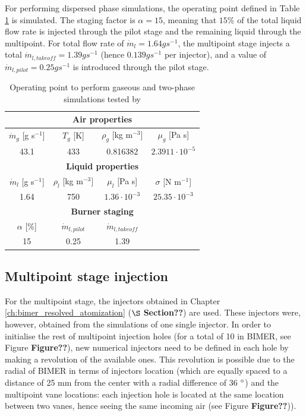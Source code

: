 For performing dispersed phase simulations, the operating point defined in Table \ref{tab:liquid_operating_point_Renaud} is simulated. The staging factor is $\alpha = 15$, meaning that $15 \%$ of the total liquid flow rate is injected through the pilot stage and the remaining liquid through the multipoint. For total flow rate of $\dot{m}_l = 1.64 g s^{-1}$, the multipoint stage injects a total $\dot{m}_{l,takeoff} = 1.39 g s^{-1}$ (hence $0.139 g s^{-1}$ per injector), and a value of $\dot{m}_{l,pilot} = 0.25 g s^{-1}$ is introduced through the pilot stage.

\begin{table}[!h]
\centering
\caption{Operating point to perform gaseous and two-phase simulations tested by }
\begin{tabular}{|c|c|c|c|}
\hline
\multicolumn{4}{|c|}{\textbf{Air properties}} \\
\hline
$\dot{m}_g$ [g s$^{-1}$] & $T_g$ [K] & $\rho_g$ [kg m$^{-3}$]  & $\mu_g$ [Pa s]  \\
\hline
43.1 & 433 & 0.816382 & $2.3911 \cdot 10^{-5}$ \\
\hline
\hline
\multicolumn{4}{|c|}{\textbf{Liquid properties}} \\
\hline
$\dot{m}_l$ [g s$^{-1}$] & $\rho_l$ [kg m$^{-3}]$   & $\mu_l$ [Pa s]   & $\sigma$ [N m$^{-1}$]   \\
\hline
1.64 & 750 & $1.36 \cdot 10^{-3}$ & $25.35 \cdot 10^{-3}$ \\
\hline
\hline
\multicolumn{4}{|c|}{\textbf{Burner staging}} \\
\hline
$\alpha$ [$\%$] & $\dot{m}_{l,pilot}$ & $\dot{m}_{l,takeoff}$ & \\
\hline
15 & 0.25 & 1.39 & \\
\hline
\end{tabular}
\label{tab:liquid_operating_point_Renaud}
\end{table}


\subsection{Multipoint stage injection}

For the multipoint stage, the injectors obtained in Chapter \ref{ch:bimer_resolved_atomization} ($\S$ \textbf{Section??}) are used. These injectors were, however, obtained from the simulations of one single injector. In order to initialise the rest of multipoint injection holes (for a total of 10 in BIMER, see Figure \textbf{Figure??}), new numerical injectors need to be defined in each hole by making a revolution of the available ones. This revolution is possible due to the radial of BIMER in terms of injectors location (which are equally spaced to a distance of 25 mm from the center with a radial difference of 36 $\degree$) and the multipoint vane locations: each injection hole is located at the same location between two vanes, hence seeing the same incoming air (see Figure \textbf{Figure??})).

